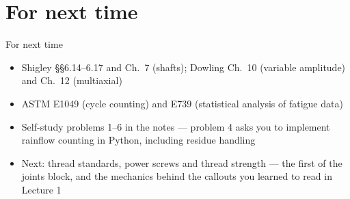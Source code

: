 \documentclass[aspectratio=169,10pt]{beamer}
\begin{document}
\section{For next time}

\begin{frame}{For next time}
\begin{itemize}
  \item Shigley \S\S6.14--6.17 and Ch.\ 7 (shafts); Dowling Ch.\ 10 (variable amplitude) and Ch.\ 12 (multiaxial)
  \item ASTM E1049 (cycle counting) and E739 (statistical analysis of fatigue data)
  \item Self-study problems 1--6 in the notes --- problem 4 asks you to implement rainflow counting in Python, including residue handling
  \item Next: \alert{thread standards, power screws and thread strength} --- the first of the joints block, and the mechanics behind the callouts you learned to read in Lecture 1
\end{itemize}
\end{frame}
\end{document}
